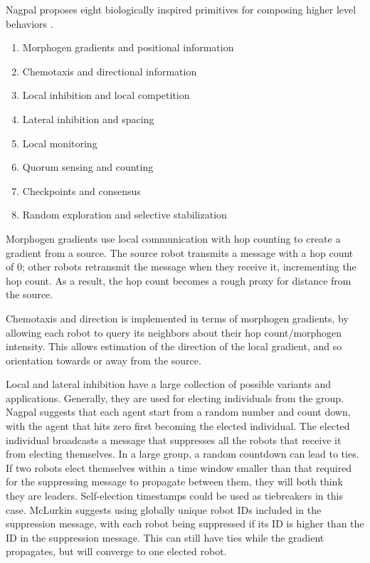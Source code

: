 \documentclass[]{article}
\begin{document}
Nagpal proposes eight biologically inspired primitives for composing higher level behaviors \cite{nagpal2004catalog}.
 
\begin{enumerate}[noitemsep]
\item Morphogen gradients and positional information
\item Chemotaxis and directional information
\item Local inhibition and local competition
\item Lateral inhibition and spacing
\item Local monitoring
\item Quorum sensing and counting
\item Checkpoints and consensus
\item Random exploration and selective stabilization
\end{enumerate}

Morphogen gradients use local communication with hop counting to create a gradient from a source. 
The source robot transmits a message with a hop count of 0; other robots retransmit the message when they receive it, incrementing the hop count. 
As a result, the hop count becomes a rough proxy for distance from the source. 

Chemotaxis and direction is implemented in terms of morphogen gradients, by allowing each robot to query its neighbors about their hop count/morphogen intensity. 
This allows estimation of the direction of the local gradient, and so orientation towards or away from the source. 

Local and lateral inhibition have a large collection of possible variants and applications. 
Generally, they are used for electing individuals from the group. 
Nagpal suggests that each agent start from a random number and count down, with the agent that hits zero first becoming the elected individual. 
The elected individual broadcasts a message that suppresses all the robots that receive it from electing themselves. 
In a large group, a random countdown can lead to ties.
If two robots elect themselves within a time window smaller than that required for the suppressing message to propagate between them, they will both think they are leaders.
Self-election timestamps could be used as tiebreakers in this case. 
McLurkin suggests using globally unique robot IDs included in the suppression message, with each robot being suppressed if its ID is higher than the ID in the suppression message.
This can still have ties while the gradient propagates, but will converge to one elected robot.
 
\end{document}

